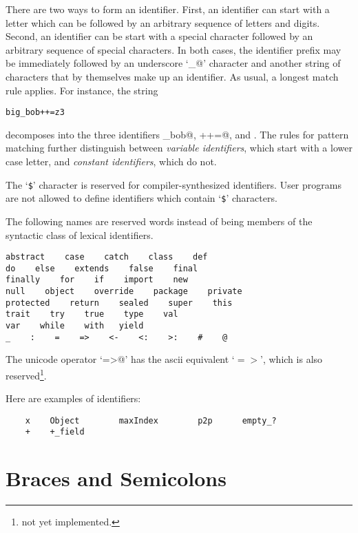 \documentclass[a4paper,12pt,twoside,titlepage]{book}
\newcommand{\notyet}{\footnote{not yet implemented.}}
\begin{document}
There are two ways to form an identifier. First, an identifier can
start with a letter which can be followed by an arbitrary sequence of
letters and digits. Second, an identifier can be start with a special
character followed by an arbitrary sequence of special characters.
In both cases, the identifier prefix may be immediately followed
by an underscore `\lstinline@_@' character and another string of characters
that by themselves make up an identifier.  As usual, a longest match
rule applies. For instance, the string

\begin{lstlisting}
big_bob++=z3
\end{lstlisting}

decomposes into the three identifiers \lstinline@big_bob@, \lstinline@++=@, and
.  The rules for pattern matching further distinguish between
{\em variable identifiers}, which start with a lower case letter, and
{\em constant identifiers}, which do not.


The `\lstinline[mathescape=false]@$@'\comment{$} character is reserved for compiler-synthesized identifiers.
User programs are not allowed to define identifiers which contain `\lstinline[mathescape=false]@$@'\comment{$}
characters. 

The following names are reserved words instead of being members of the
syntactic class  of lexical identifiers.

\begin{lstlisting}
abstract    case    catch    class    def    
do    else    extends    false    final    
finally    for    if    import    new    
null    object    override    package    private    
protected    return    sealed    super    this    
trait    try    true    type    val    
var    while    with   yield
_    :    =    =>    <-    <:    >:    #    @
\end{lstlisting}

The unicode operator `\lstinline@=>@' has the ascii equivalent
`$=>$', which is also reserved\notyet.

\example
Here are examples of identifiers:
\begin{lstlisting}
    x    Object        maxIndex        p2p      empty_?
    +    +_field
\end{lstlisting}

\section{Braces and Semicolons}
\end{document}

